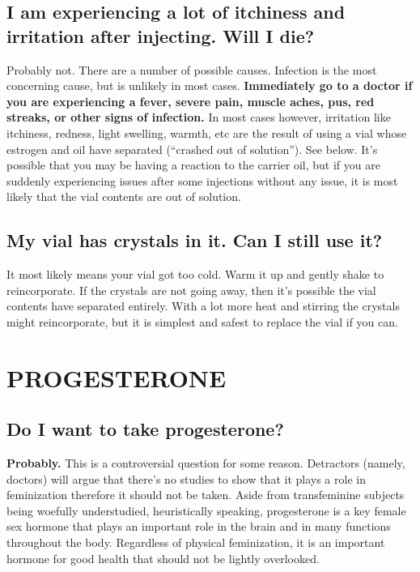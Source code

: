 \documentclass{article}
\begin{document}
\subsection{I am experiencing a lot of itchiness and irritation after injecting. Will I die?}

Probably not. There are a number of possible causes. Infection is the most concerning cause, but is unlikely in most cases. \textbf{Immediately go to a doctor if you are experiencing a fever, severe pain, muscle aches, pus, red streaks, or other signs of infection. }In most cases however, irritation like itchiness, redness, light swelling, warmth, etc are the result of using a vial whose estrogen and oil have separated (“crashed out of solution”). See below. It’s possible that you may be having a reaction to the carrier oil, but if you are suddenly experiencing issues after some injections without any issue, it is most likely that the vial contents are out of solution.

\subsection{My vial has crystals in it. Can I still use it?}

It most likely means your vial got too cold. Warm it up and gently shake to reincorporate. If the crystals are not going away, then it’s possible the vial contents have separated entirely. With a lot more heat and stirring the crystals might reincorporate, but it is simplest and safest to replace the vial if you can.

 

\section{PROGESTERONE}

\subsection{Do I want to take progesterone?}

\textbf{Probably.} This is a controversial question for some reason. Detractors (namely, doctors) will argue that there’s no studies to show that it plays a role in feminization therefore it should not be taken. Aside from transfeminine subjects being woefully understudied, heuristically speaking, progesterone is a key female sex hormone that plays an important role in the brain and in many functions throughout the body. Regardless of physical feminization, it is an important hormone for good health that should not be lightly overlooked.
\end{document}
